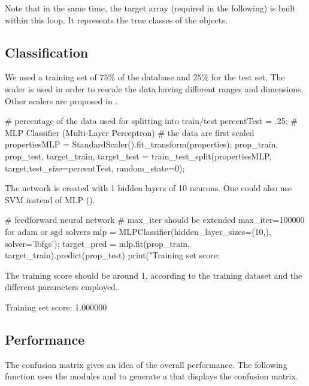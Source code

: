 Note that in the same time, the target array (required in the following) is built within this loop. It represents the true classes of the objects.

\vspace*{-6pt}

\subsection{Classification}
We used a training set of $75\%$ of the database and $25\%$ for the test set. The scaler is used in order to rescale the data having different ranges and dimensions. Other scalers are proposed in .

\begin{python}
# percentage of the data used for splitting into train/test
percentTest = .25;
# MLP Classifier (Multi-Layer Perceptron)
# the data are first scaled
propertiesMLP = StandardScaler().fit_transform(properties);
prop_train, prop_test, target_train, target_test = train_test_split(propertiesMLP, target,test_size=percentTest, random_state=0);
\end{python}

\vspace*{-2pt}

The network is created with 1 hidden layers of 10 neurons. One could also use SVM instead of MLP ().

\begin{python}
# feedforward neural network
# max_iter should be extended max_iter=100000 for adam or sgd solvers
mlp = MLPClassifier(hidden_layer_sizes=(10,), solver='lbfgs');
target_pred = mlp.fit(prop_train, target_train).predict(prop_test)
print("Training set score: %
\end{python}

The training score should be around 1, according to the training dataset and the different parameters employed.
\begin{sh}
Training set score: 1.000000
\end{sh}

\vspace*{-8pt}

\subsection{Performance}
The confusion matrix gives an idea of the overall performance. The following function uses the modules  and  to generate a  that displays the confusion matrix.

